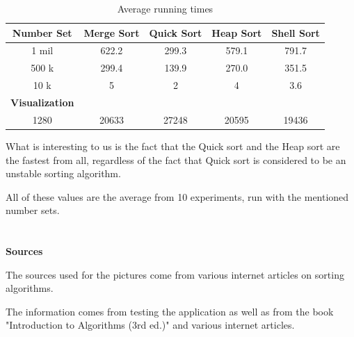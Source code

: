 \documentclass{article}
\begin{document}
\begin{table}[H]
  \begin{center}
    \label{tab:FCFS times}
    \begin{tabular}{c|c|c|c|c}
      \toprule
      \textbf{Number Set} & \textbf{Merge Sort} & \textbf{Quick Sort} & \textbf{Heap Sort} & \textbf{Shell Sort} \\
      \midrule
      1 mil & 622.2 & 299.3 & 579.1 & 791.7 \\
      500 k & 299.4 & 139.9 & 270.0 & 351.5 \\
      10 k & 5 & 2 & 4 & 3.6 \\
      \bottomrule
      \toprule
      \textbf{Visualization} \\
      1280 & 20633 & 27248 & 20595 & 19436 \\
    \end{tabular}
    \caption{Average running times}
  \end{center}
\end{table}

What is interesting to us is the fact that the Quick sort and the Heap sort are the fastest from all, regardless of the fact that Quick sort is considered to be an unstable sorting algorithm.

All of these values are the average from 10 experiments, run with the mentioned number sets.
\\
\\
\\
\textbf{Sources}

The sources used for the pictures come from various internet articles on sorting algorithms.

The information comes from testing the application as well as from the book "Introduction to Algorithms (3rd ed.)" and various internet articles.
\end{document}
